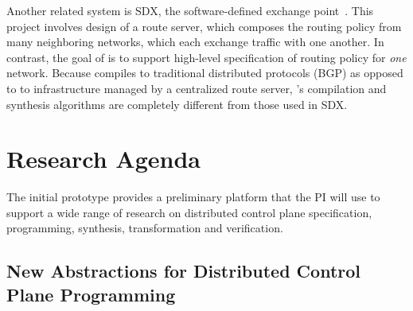 Another related system is SDX, the software-defined exchange 
point~\cite{sdx,isdx}. This project involves design of a route server, which 
composes the routing policy from
many neighboring networks, which each exchange traffic
with one another.
In contrast, the goal of \Propane is to support high-level 
specification of routing policy for \emph{one}
network.  Because
\Propane compiles to traditional distributed protocols (BGP) as opposed to
to infrastructure managed by a centralized route server, 
\Propane's compilation and synthesis algorithms
are completely different from those used in SDX.




\section{Research Agenda}
\label{sec:research}

The initial \Propane prototype provides a preliminary platform that
the PI will use to support a wide range of research on distributed control
plane specification, programming, synthesis, transformation and verification.

\subsection{New Abstractions for Distributed Control Plane Programming}

